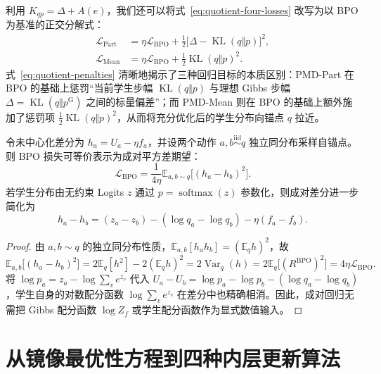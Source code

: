 \documentclass[lang=cn,scheme=chinese,openany]{elegantbook}
\newcommand{\E}{\mathbb E}
\newcommand{\KL}{\operatorname{KL}}
\newcommand{\Var}{\operatorname{Var}}
\begin{document}
利用 $K_{qp}=\Delta+A(e)$，我们还可以将式~\eqref{eq:quotient-four-losses} 改写为以 BPO 为基准的正交分解式：
\begin{align}
\mathcal L_{\mathrm{Part}}&=\eta\mathcal L_{\mathrm{BPO}}
+\frac12\bigl[\Delta-\KL(q\Vert p)\bigr]^2,\\
\mathcal L_{\mathrm{Mean}}&=\eta\mathcal L_{\mathrm{BPO}}
+\frac12\KL(q\Vert p)^2.
\label{eq:quotient-penalties}
\end{align}
式~\eqref{eq:quotient-penalties} 清晰地揭示了三种回归目标的本质区别：PMD-Part 在 BPO 的基础上惩罚“当前学生步幅 $\KL(q\Vert p)$ 与理想 Gibbs 步幅 $\Delta=\KL(q\Vert p^{\mathrm G})$ 之间的标量偏差”；而 PMD-Mean 则在 BPO 的基础上额外施加了惩罚项 $\frac12\KL(q\Vert p)^2$，从而将充分优化后的学生分布向锚点 $q$ 拉近。

\begin{proposition}[成对动作差分回归完全消去双侧归一化常数]
\label{prop:quotient-pairwise}
令未中心化差分为 $h_a=U_a-\eta f_a$，并设两个动作 $a,b\overset{\mathrm{iid}}{\sim}q$ 独立同分布采样自锚点。则 BPO 损失可等价表示为成对平方差期望：
\begin{equation}
\mathcal L_{\mathrm{BPO}}=
\frac1{4\eta}\E_{a,b\sim q}\bigl[(h_a-h_b)^2\bigr].
\end{equation}
若学生分布由无约束 Logits $z$ 通过 $p=\operatorname{softmax}(z)$ 参数化，则成对差分进一步简化为
\begin{equation}
h_a-h_b=(z_a-z_b)-(\log q_a-\log q_b)-\eta(f_a-f_b).
\end{equation}
\end{proposition}
\begin{proof}
由 $a,b\sim q$ 的独立同分布性质，$\E_{a,b}[h_a h_b]=(\E_q h)^2$，故
\begin{equation}
\E_{a,b}\bigl[(h_a-h_b)^2\bigr]=2\E_q[h^2]-2(\E_q h)^2=2\Var_q(h)=2\E_q\bigl[(R^{\mathrm{BPO}})^2\bigr]=4\eta\mathcal L_{\mathrm{BPO}}.
\end{equation}
将 $\log p_a=z_a-\log\sum_v e^{z_v}$ 代入 $U_a-U_b=\log p_a-\log p_b-(\log q_a-\log q_b)$，学生自身的对数配分函数 $\log\sum_v e^{z_v}$ 在差分中也精确相消。因此，成对回归无需把 Gibbs 配分函数 $\log Z_f$ 或学生配分函数作为显式数值输入。
\end{proof}

\section{从镜像最优性方程到四种内层更新算法}
\label{sec:ch2-objective-derivation}
\label{sec:ch2-four-methods}
\end{document}
